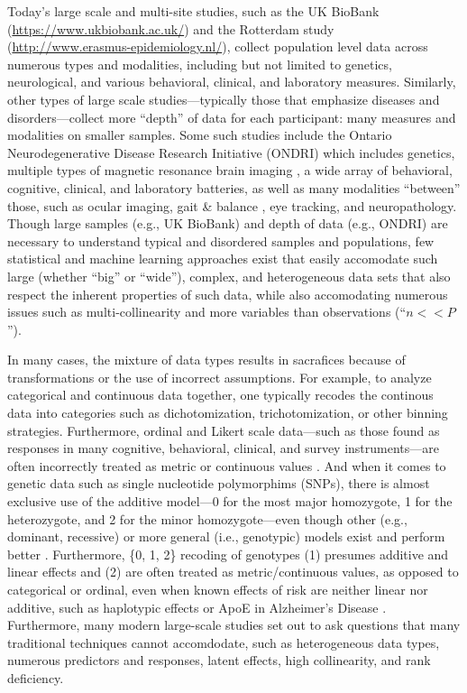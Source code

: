 \documentclass[12pt]{article}
\begin{document}
Today's large scale and multi-site studies, such as the UK BioBank
(\url{https://www.ukbiobank.ac.uk/}) and the Rotterdam study
(\url{http://www.erasmus-epidemiology.nl/}), collect population level
data across numerous types and modalities, including but not limited to
genetics, neurological, and various behavioral, clinical, and laboratory
measures. Similarly, other types of large scale studies---typically
those that emphasize diseases and disorders---collect more ``depth'' of
data for each participant: many measures and modalities on smaller
samples. Some such studies include the Ontario Neurodegenerative Disease
Research Initiative (ONDRI) \citep{farhan_ontario_2016} which includes
genetics, multiple types of magnetic resonance brain imaging
\citep{duchesne_canadian_2019}, a wide array of behavioral, cognitive,
clinical, and laboratory batteries, as well as many modalities
``between'' those, such as ocular imaging, gait \& balance
\citep{montero-odasso_motor_2017-1}, eye tracking, and neuropathology.
Though large samples (e.g., UK BioBank) and depth of data (e.g., ONDRI)
are necessary to understand typical and disordered samples and
populations, few statistical and machine learning approaches exist that
easily accomodate such large (whether ``big'' or ``wide''), complex, and
heterogeneous data sets that also respect the inherent properties of
such data, while also accomodating numerous issues such as
multi-collinearity and more variables than observations
(``\(n << P\)'').

In many cases, the mixture of data types results in sacrafices because
of transformations or the use of incorrect assumptions. For example, to
analyze categorical and continuous data together, one typically recodes
the continous data into categories such as dichotomization,
trichotomization, or other binning strategies. Furthermore, ordinal and
Likert scale data---such as those found as responses in many cognitive,
behavioral, clinical, and survey instruments---are often incorrectly
treated as metric or continuous values \citep{burkner_ordinal_nodate}.
And when it comes to genetic data such as single nucleotide polymorphims
(SNPs), there is almost exclusive use of the additive model---0 for the
most major homozygote, 1 for the heterozygote, and 2 for the minor
homozygote---even though other (e.g., dominant, recessive) or more
general (i.e., genotypic) models exist and perform better
\citep{lettre2007genetic}. Furthermore, \{0, 1, 2\} recoding of
genotypes (1) presumes additive and linear effects and (2) are often
treated as metric/continuous values, as opposed to categorical or
ordinal, even when known effects of risk are neither linear nor
additive, such as haplotypic effects \citep{vormfelde_value_2007} or
ApoE in Alzheimer's Disease \citep{genin_apoe_2011}. Furthermore, many
modern large-scale studies set out to ask questions that many
traditional techniques cannot accomdodate, such as heterogeneous data
types, numerous predictors and responses, latent effects, high
collinearity, and rank deficiency.
\end{document}
